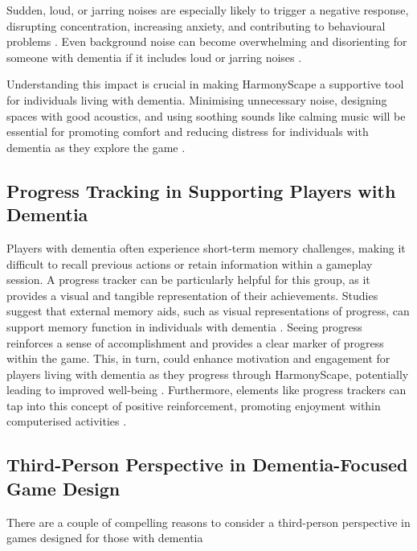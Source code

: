 \documentclass{l4proj}
\begin{document}
Sudden, loud, or jarring noises are especially likely to trigger a negative response, disrupting concentration, increasing anxiety, and contributing to behavioural problems \citep{shirsat_music_nodate}. Even background noise can become overwhelming and disorienting for someone with dementia if it includes loud or jarring noises \citep{shirsat_music_nodate}.

Understanding this impact is crucial in making HarmonyScape a supportive tool for individuals living with dementia. Minimising unnecessary noise, designing spaces with good acoustics, and using soothing sounds like calming music will be essential for promoting comfort and reducing distress for individuals with dementia as they explore the game \citep{caspar_nonpharmacological_2018}.

\subsection{Progress Tracking in Supporting Players with Dementia}\label{sec:progress_tracking}
Players with dementia often experience short-term memory challenges, making it difficult to recall previous actions or retain  information within a gameplay session. A progress tracker can be particularly helpful for this group, as it provides a visual and tangible representation of their achievements. Studies suggest that external memory aids, such as visual representations of progress, can support memory function in individuals with dementia \citep{bourgeois_comparison_2003}. Seeing progress reinforces a sense of accomplishment and  provides a clear marker of progress within the game. This, in turn, could enhance motivation and engagement for players living with dementia as they progress through HarmonyScape, potentially leading to improved well-being \citep{orrell_impact_2017}. Furthermore, elements like progress trackers can tap into this concept of positive reinforcement, promoting enjoyment within computerised activities \citep{vermeir_effects_2020}.

\subsection{Third-Person Perspective in Dementia-Focused Game Design}\label{sec:third_person}
There are a couple of compelling reasons to consider a third-person perspective in games designed for those with dementia
\end{document}
